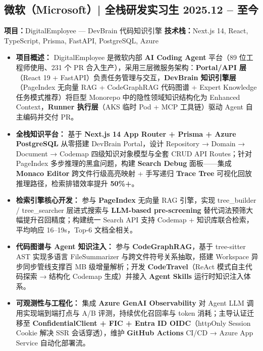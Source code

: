 \documentclass[10pt]{article}
\begin{document}
\subsection{\texorpdfstring{微软（Microsoft）| 全栈研发实习生 \hfill \rm{\small 2025.12 -- 至今}}{微软 全栈研发实习生}}
\vspace{0.1em}
\small{\textbf{项目：}DigitalEmployee — DevBrain 代码知识引擎 \quad \textbf{技术栈：}Next.js 14, React, TypeScript, Prisma, FastAPI, PostgreSQL, Azure}
\vspace{0.2em}
\begin{itemize}
    \item \textbf{项目概述：} DigitalEmployee 是微软内部 \textbf{AI Coding Agent} 平台（89 位工程师使用、231 个 PR 合入生产），采用三层微服务架构：\textbf{Portal/API 层}（React 19 + FastAPI）负责任务管理与交互，\textbf{DevBrain 知识引擎层}（PageIndex 无向量 RAG + CodeGraphRAG 代码图谱 + Expert Knowledge 任务模式推荐）将巨型 Monorepo 中的隐性领域知识结构化为 Enhanced Context，\textbf{Runner 执行层}（AKS 临时 Pod + MCP 工具链）驱动 Agent 自主编码并交付 PR。
    \item \textbf{全栈知识平台：} 基于 \textbf{Next.js 14 App Router + Prisma + Azure PostgreSQL} 从零搭建 DevBrain Portal，设计 Repository → Domain → Document → Codemap 四级知识对象模型与全套 CRUD API Routes；针对 PageIndex 多步推理的黑盒问题，构建 \textbf{Search Debug} 面板——集成 \textbf{Monaco Editor} 跨文件行级高亮映射 + 手写递归 \textbf{Trace Tree} 可视化回放推理路径，检索排错效率提升 \textbf{50\%+}。
    \item \textbf{检索引擎核心开发：} 参与 \textbf{PageIndex} 无向量 RAG 引擎，实现 tree\_builder / tree\_searcher 层进式搜索与 \textbf{LLM-based pre-screening} 替代词法预筛大幅提升召回精度；构建统一 Search API 支持 Codemap + 知识库联合检索，平均响应 16--19s，Top-6 文档全相关。
    \item \textbf{代码图谱与 Agent 知识注入：} 参与 \textbf{CodeGraphRAG}，基于 tree-sitter AST 实现多语言 FileSummarizer 与跨文件符号关系抽取，搭建 Workspace 异步同步管线支撑百 MB 级增量解析；开发 \textbf{CodeTravel}（ReAct 模式自主代码探索 → 结构化 Codemap 生成）并接入 \textbf{Agent Skills} 运行时知识注入体系。
    \item \textbf{可观测性与工程化：} 集成 \textbf{Azure GenAI Observability} 对 Agent LLM 调用实现端到端打点与 A/B 评测，持续优化召回率与 token 消耗；主导认证迁移至 \textbf{ConfidentialClient + FIC + Entra ID OIDC}（httpOnly Session Cookie 解决 SSR 会话穿透），维护 \textbf{GitHub Actions} CI/CD → Azure App Service 自动化部署流。
\end{itemize}
\end{document}
